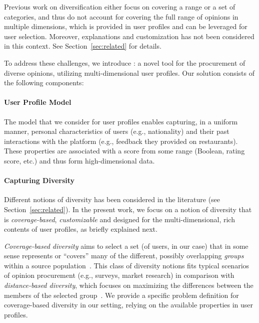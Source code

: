 

Previous work on diversification either focus on covering a range or a set of categories, and thus do not account for covering the full range of opinions in multiple dimensions, which is provided in user profiles and can be leveraged for user selection. Moreover, explanations and customization  has not been considered in this context. See Section~\ref{sec:related} for details.

To address these challenges, we introduce \sysname{}:  
a novel tool for the procurement of diverse opinions, utilizing multi-dimensional user profiles. Our solution consists of the following components:

\paragraph*{User Profile Model} The model that we consider for user profiles enables capturing, in a uniform manner, personal characteristics of users 
(e.g., nationality) and their past interactions with the platform (e.g., feedback they provided on restaurants). These properties are associated with a score from some range (Boolean, rating score, etc.) and thus form high-dimensional data.


\paragraph*{Capturing Diversity} 
Different notions of diversity has been considered in the literature (see  Section~\ref{sec:related}). In the present work, we focus on a notion of diversity that is \emph{coverage-based}, \emph{customizable} and designed for the multi-dimensional, rich contents of user profiles, as briefly explained next.

\emph{Coverage-based diversity} aims to select a set (of users, in our case) that in some sense represents or ``covers'' many of the different, possibly overlapping \emph{groups} within a source population~\cite{agrawal2009diversifying,servajean2013profile,wu2015hear}.
This class of diversity notions fits typical scenarios of opinion procurement (e.g., surveys, market research) in comparison with \emph{distance-based diversity}, which focuses on maximizing the differences between the members of the selected group~\cite{wu2015hear}. We provide a specific problem definition for coverage-based diversity in our setting, relying on the available properties in user profiles.

